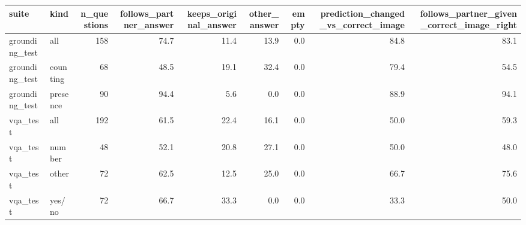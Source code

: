 \begin{tabular}{llrrrrrrr}
\toprule
suite & kind & n\_questions & follows\_partner\_answer & keeps\_original\_answer & other\_answer & empty & prediction\_changed\_vs\_correct\_image & follows\_partner\_given\_correct\_image\_right \\
\midrule
grounding\_test & all & 158 & 74.7 & 11.4 & 13.9 & 0.0 & 84.8 & 83.1 \\
grounding\_test & counting & 68 & 48.5 & 19.1 & 32.4 & 0.0 & 79.4 & 54.5 \\
grounding\_test & presence & 90 & 94.4 & 5.6 & 0.0 & 0.0 & 88.9 & 94.1 \\
vqa\_test & all & 192 & 61.5 & 22.4 & 16.1 & 0.0 & 50.0 & 59.3 \\
vqa\_test & number & 48 & 52.1 & 20.8 & 27.1 & 0.0 & 50.0 & 48.0 \\
vqa\_test & other & 72 & 62.5 & 12.5 & 25.0 & 0.0 & 66.7 & 75.6 \\
vqa\_test & yes/no & 72 & 66.7 & 33.3 & 0.0 & 0.0 & 33.3 & 50.0 \\
\bottomrule
\end{tabular}
